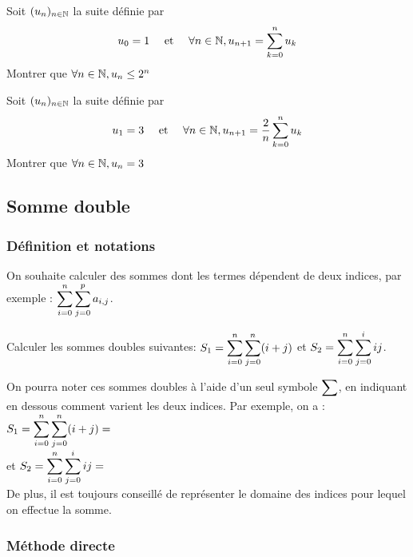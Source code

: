 \documentclass[a4paper, 11pt,reqno]{article}
\begin{document}
\begin{exercice}
Soit $(u_n)_{n\in \mathbb{N}}$ la suite définie par 
$$u_0=1 \quad \text{ et } \quad \forall n\in \mathbb{N}, u_{n+1} =\sum_{k=0}^n u_k$$
Montrer que $\forall n \in \mathbb{N}, u_n\leq 2^n$
\end{exercice}


\begin{exercice}
Soit $(u_n)_{n\in \mathbb{N}}$ la suite définie par 
$$u_1=3 \quad \text{ et } \quad \forall n\in \mathbb{N}, u_{n+1} =\frac{2}{n}\sum_{k=0}^n u_k$$
Montrer que $\forall n \in \mathbb{N}, u_n=3$
\end{exercice}
\subsection{Somme double}



\subsubsection{D\'efinition et notations}


\noindent On souhaite calculer des sommes dont les termes d\'ependent de deux indices, par exemple : $\displaystyle \sum_{i=0}^n \sum_{j=0}^p a_{i,j}$.

\begin{exemples}
Calculer les sommes doubles suivantes: $S_1=\displaystyle\sum\limits_{i=0}^n\sum\limits_{j=0}^n (i+j)$ et $S_2=\displaystyle \sum\limits_{i=0}^n\sum\limits_{j=0}^i ij$.

\end{exemples}


\begin{rem}
On pourra noter ces sommes doubles \`a l'aide d'un seul symbole $\displaystyle \sum$, en indiquant en dessous comment varient les deux indices. Par exemple, on a : $S_1=\ddp\sum\limits_{i=0}^n\sum\limits_{j=0}^n (i+j) = \dotfill$ \\
et $S_2=\ddp \sum\limits_{i=0}^n\sum\limits_{j=0}^i ij = \dotfill$\\
De plus, il est toujours conseill\'e de repr\'esenter le domaine des indices pour lequel on effectue la somme.
\end{rem}

\vspace*{0.5cm}

\subsubsection{M\'ethode directe}
\end{document}
